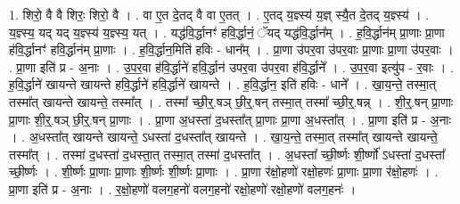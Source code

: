 \documentclass[17pt]{extarticle}
\begin{document}
1. शिरो॒ वै वै शिरः॒ शिरो॒ वै । . वा ए॒त दे॒तद् वै वा ए॒तत् । . ए॒तद् य॒ज्ञ्स्य॑ य॒ज्ञ् स्यै॒त दे॒तद् य॒ज्ञ्स्य॑ । . य॒ज्ञ्स्य॒ यद् यद् य॒ज्ञ्स्य॑ य॒ज्ञ्स्य॒ यत् । . यद्ध॑वि॒र्द्धानꣳ॑ हवि॒र्द्धानं॒ ॅयद् यद्ध॑वि॒र्द्धान᳚म् । . ह॒वि॒र्द्धान॑म् प्रा॒णाः प्रा॒णा ह॑वि॒र्द्धानꣳ॑ हवि॒र्द्धान॑म् प्रा॒णाः । . ह॒वि॒र्द्धान॒मिति॑ हविः - धान᳚म् । . प्रा॒णा उ॑पर॒वा उ॑पर॒वाः प्रा॒णाः प्रा॒णा उ॑पर॒वाः । . प्रा॒णा इति॑ प्र - अ॒नाः । . उ॒प॒र॒वा ह॑वि॒र्द्धाने॑ हवि॒र्द्धान॑ उपर॒वा उ॑पर॒वा ह॑वि॒र्द्धाने᳚ । . उ॒प॒र॒वा इत्यु॑प - र॒वाः । . ह॒वि॒र्द्धाने॑ खायन्ते खायन्ते हवि॒र्द्धाने॑ हवि॒र्द्धाने॑ खायन्ते । . ह॒वि॒र्द्धान॒ इति॑ हविः - धाने᳚ । . खा॒य॒न्ते॒ तस्मा॒त् तस्मा᳚त् खायन्ते खायन्ते॒ तस्मा᳚त् । . तस्मा᳚ च्छी॒र्॒.षञ् छी॒र्॒.षन् तस्मा॒त् तस्मा᳚ च्छी॒र्॒.षन्न् । . शी॒र्॒.षन् प्रा॒णाः प्रा॒णाः शी॒र्॒.षञ् छी॒र्॒.षन् प्रा॒णाः । . प्रा॒णा अ॒धस्ता॑ द॒धस्ता᳚त् प्रा॒णाः प्रा॒णा अ॒धस्ता᳚त् । . प्रा॒णा इति॑ प्र - अ॒नाः । . अ॒धस्ता᳚त् खायन्ते खायन्ते॒ ऽधस्ता॑ द॒धस्ता᳚त् खायन्ते । . खा॒य॒न्ते॒ तस्मा॒त् तस्मा᳚त् खायन्ते खायन्ते॒ तस्मा᳚त् । . तस्मा॑ द॒धस्ता॑ द॒धस्ता॒त् तस्मा॒त् तस्मा॑ द॒धस्ता᳚त् । . अ॒धस्ता᳚ च्छी॒र्ष्णः शी॒र्ष्णो॑ ऽधस्ता॑ द॒धस्ता᳚ च्छी॒र्ष्णः । . शी॒र्ष्णः प्रा॒णाः प्रा॒णाः शी॒र्ष्णः शी॒र्ष्णः प्रा॒णाः । . प्रा॒णा र॑क्षो॒हणो॑ रक्षो॒हणः॑ प्रा॒णाः प्रा॒णा र॑क्षो॒हणः॑ । . प्रा॒णा इति॑ प्र - अ॒नाः । . र॒क्षो॒हणो॑ वलग॒हनो॑ वलग॒हनो॑ रक्षो॒हणो॑ रक्षो॒हणो॑ वलग॒हनः॑ । \newline
\end{document}
